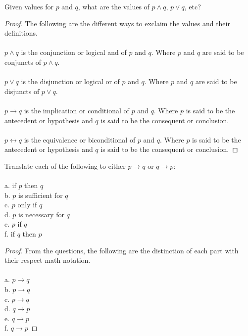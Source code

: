 \documentclass[12pt]{article}
\newenvironment{exercise}[2][Exercise]{\begin{trivlist}
\item[\hskip \labelsep {\bfseries #1}\hskip \labelsep {\bfseries #2.}]}{\end{trivlist}}
\begin{document}
\begin{exercise}{4}
Given values for $p$ and $q$, what are the values of $p \land q$, $p \lor q$, etc? 
\end{exercise}

\begin{proof}
The following are the different ways to exclaim the values and their definitions. \\ \\
$p \land q$ is the conjunction or logical and of $p$ and $q$. Where $p$ and $q$ are said to be conjuncts of $p \land q$. \\ \\
$p \lor q$ is the disjunction or logical or of $p$ and $q$. Where $p$ and $q$ are said to be disjuncts of $p \lor q$. \\ \\ 
$p \rightarrow q$ is the implication or conditional of $p$ and $q$. Where $p$ is said to be the antecedent or hypothesis and $q$ is said to be the consequent or conclusion. \\ \\
$p \leftrightarrow q$ is the equivalence or biconditional of $p$ and $q$. Where $p$ is said to be the antecedent or hypothesis and $q$ is said to be the consequent or conclusion. 

\end{proof}

\begin{exercise}{5}
Translate each of the following to either $p \rightarrow q$ or $q \rightarrow p$: \\ \\
a. if $p$ then $q$ \\ 
b. $p$ is sufficient for $q$ \\
c. $p$ only if $q$ \\ 
d. $p$ is necessary for $q$ \\ 
e. $p$ if $q$ \\ 
f. if $q$ then $p$
\end{exercise}

\begin{proof} 
From the questions, the following are the distinction of each part with their respect math notation. \\ \\ 
a. $p \rightarrow q$ \\ 
b. $p \rightarrow q$ \\
c. $p \rightarrow q$ \\
d. $q \rightarrow p$ \\
e. $q \rightarrow p$ \\
f. $q \rightarrow p$

\end{proof}
\end{document}
